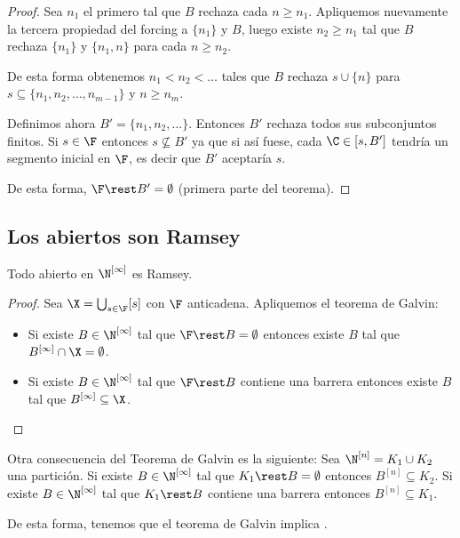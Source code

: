 \begin{proof}
    Sea $n_1$ el primero tal que $B$ rechaza cada $n \geq n_1$. Apliquemos nuevamente la tercera propiedad del forcing a $\{n_1\}$ y $B$, luego existe $n_2 \geq n_1$ tal que $B$ rechaza $\{n_1\}$ y $\{n_1, n\}$ para cada $n \geq n_2$.
        
    De esta forma obtenemos $n_1 < n_2 < \dots$ tales que $B$ rechaza $s \cup \{n\}$ para $s \subseteq \{n_1, n_2, \dots, n_{m-1}\}$ y $n \geq n_m$.
        
    Definimos ahora $B' = \{n_1, n_2, \dots\}$. Entonces $B'$ rechaza todos sus subconjuntos finitos. Si $s \in \F$ entonces $s \nsubseteq B'$ ya que si así fuese, cada $\C \in [s, B']$ tendría un segmento inicial en $\F$, es decir que $B'$ aceptaría $s$.
        
    De esta forma, $\F \rest B' = \emptyset$ (primera parte del teorema).
\end{proof}

\subsection{Los abiertos son Ramsey}

\begin{teo}
    Todo abierto en $\N^{[\infty]}$ es Ramsey.
\end{teo}

\begin{proof}
    Sea $\X = \bigcup_{s \in \F} [s]$ con $\F$ anticadena. Apliquemos el teorema de Galvin:
    
    \begin{itemize}
        \item Si existe $B \in \N^{[\infty]}$ tal que $\F \rest B = \emptyset$ entonces existe $B$ tal que $B^{[\infty]} \cap \X = \emptyset$.
        \item Si existe $B \in \N^{[\infty]}$ tal que $\F \rest B$ contiene una barrera entonces existe $B$ tal que $B^{[\infty]} \subseteq \X$.
    \end{itemize}
\end{proof}

\begin{nota}
    Otra consecuencia del Teorema de Galvin es la siguiente: Sea $\N^{[n]} = K_1 \cup K_2$ una partición. Si existe $B \in \N^{[\infty]}$ tal que $K_1 \rest B = \emptyset$ entonces $B^{[n]} \subseteq K_2$. Si existe $B \in \N^{[\infty]}$ tal que $K_1 \rest B$ contiene una barrera entonces $B^{[n]} \subseteq K_1$.
    
    De esta forma, tenemos que el teorema de Galvin implica \TR.
\end{nota}